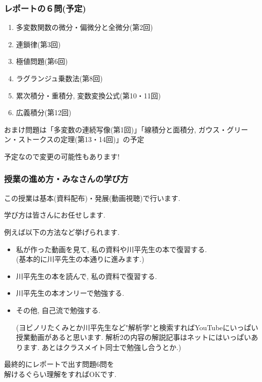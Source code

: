 \documentclass[11pt,dvipdfmx]{beamer}
\theoremstyle{definition}
\theoremstyle{remark}
\begin{document}
\begin{frame}
\frametitle{レポートの６問(予定)}
 \begin{enumerate}
 \item 多変数関数の微分・偏微分と全微分(第2回)
 \item 連鎖律(第3回)
 \item 極値問題(第6回)
 \item ラグランジュ乗数法(第8回)
 \item 累次積分・重積分, 変数変換公式(第10・11回)
 \item 広義積分(第12回)
 \end{enumerate}
 
 おまけ問題は「多変数の連続写像(第1回)」「線積分と面積分, ガウス・グリーン・ストークスの定理(第13・14回)」の予定
 
   \begin{alertblock}{}
  \begin{center}
予定なので変更の可能性もあります!
  \end{center}
 \end{alertblock}


\end{frame}

\begin{frame}
\frametitle{授業の進め方・みなさんの学び方}
この授業は基本(資料配布)・発展(動画視聴)で行います.


 \begin{alertblock}{}
  \begin{center}
学び方は皆さんにお任せします.
  \end{center}
 \end{alertblock}
 例えば以下の方法など挙げられます.
  \begin{itemize}
  \item 私が作った動画を見て, 私の資料や川平先生の本で復習する.  \\
  (基本的に川平先生の本通りに進みます.)
  \item 川平先生の本を読んで, 私の資料で復習する.
  \item 川平先生の本オンリーで勉強する.
  \item その他, 自己流で勉強する.
  
  {\tiny (ヨビノリたくみとか川平先生など"解析学"と検索すればYouTubeにいっぱい授業動画があると思います. 解析2の内容の解説記事はネットにはいっぱいあります. あとはクラスメイト同士で勉強し合うとか.)}
  \end{itemize}

  \begin{alertblock}{}
  \begin{center}
最終的にレポートで出す問題6問を\\ 解けるぐらい理解をすればOKです.
  \end{center}
 \end{alertblock}


\end{frame}
\end{document}
